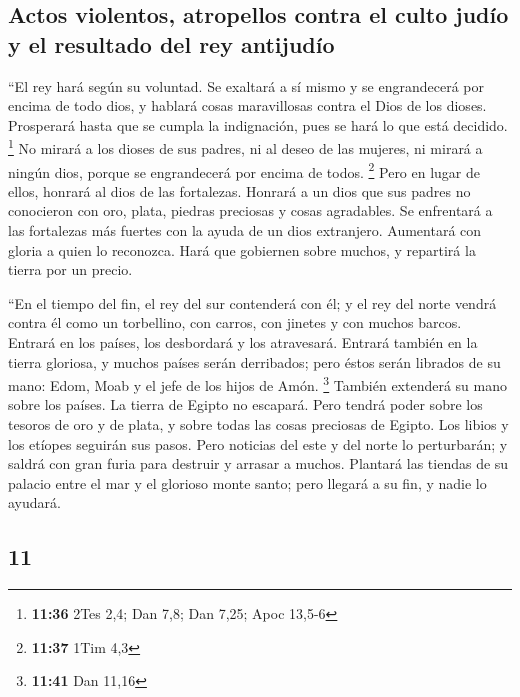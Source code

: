 \begin{paracol}{2}
{\subsection{Actos violentos, atropellos contra el culto judío y el
resultado del rey
antijudío}\label{actos-violentos-atropellos-contra-el-culto-juduxedo-y-el-resultado-del-rey-antijuduxedo}}

 ``El rey hará según su voluntad. Se exaltará a sí mismo
y se engrandecerá por encima de todo dios, y hablará cosas maravillosas
contra el Dios de los dioses. Prosperará hasta que se cumpla la
indignación, pues se hará lo que está decidido. \footnote{\textbf{11:36}
  2Tes 2,4; Dan 7,8; Dan 7,25; Apoc 13,5-6}  No mirará a
los dioses de sus padres, ni al deseo de las mujeres, ni mirará a ningún
dios, porque se engrandecerá por encima de todos. \footnote{\textbf{11:37}
  1Tim 4,3}  Pero en lugar de ellos, honrará al dios de
las fortalezas. Honrará a un dios que sus padres no conocieron con oro,
plata, piedras preciosas y cosas agradables.  Se
enfrentará a las fortalezas más fuertes con la ayuda de un dios
extranjero. Aumentará con gloria a quien lo reconozca. Hará que
gobiernen sobre muchos, y repartirá la tierra por un precio.

 ``En el tiempo del fin, el rey del sur contenderá con
él; y el rey del norte vendrá contra él como un torbellino, con carros,
con jinetes y con muchos barcos. Entrará en los países, los desbordará y
los atravesará.  Entrará también en la tierra gloriosa, y
muchos países serán derribados; pero éstos serán librados de su mano:
Edom, Moab y el jefe de los hijos de Amón. \footnote{\textbf{11:41} Dan
  11,16}  También extenderá su mano sobre los países. La
tierra de Egipto no escapará.  Pero tendrá poder sobre
los tesoros de oro y de plata, y sobre todas las cosas preciosas de
Egipto. Los libios y los etíopes seguirán sus pasos. 
Pero noticias del este y del norte lo perturbarán; y saldrá con gran
furia para destruir y arrasar a muchos.  Plantará las
tiendas de su palacio entre el mar y el glorioso monte santo; pero
llegará a su fin, y nadie lo ayudará.

\switchcolumn
\begin{otherlanguage}{english}

\hypertarget{section-21}{%
\section{11}\label{section-21}}


\end{otherlanguage}
\end{paracol}
